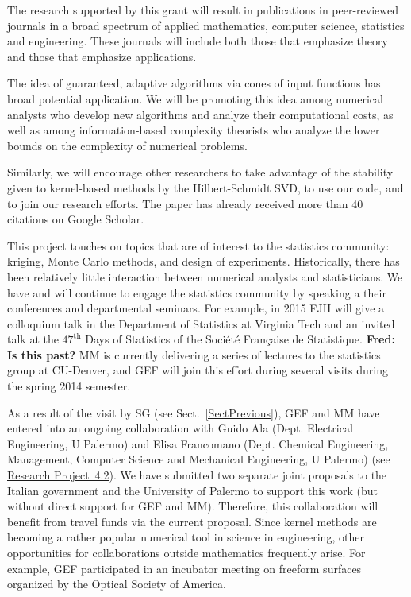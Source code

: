 \documentclass[11pt]{NSFamsart}
\newcommand{\refprobdb}{\hyperref[SectMEEG]{Research Project~4.2}\xspace}
\begin{document}
\begin{description}[leftmargin=0ex]
\item[Disseminating Research]
The research supported by this grant will result in publications in peer-reviewed journals in a broad spectrum of applied mathematics, computer science, statistics and engineering. These journals will include both those that emphasize theory and those that emphasize applications.

\item[Promoting Cones] The idea of guaranteed, adaptive algorithms via cones of input functions has broad potential application.  We will be promoting this idea among numerical analysts who develop new algorithms and analyze their computational costs, as well as among information-based complexity theorists who analyze the lower bounds on the complexity of numerical problems.

\item[Promoting the Hilbert-Schmidt SVD] Similarly, we will encourage other researchers to take advantage of the stability given to kernel-based methods by the Hilbert-Schmidt SVD, to use our code, and to join our research efforts. The paper \citep{FMcC12} has already received more than 40 citations on Google Scholar.

\item[Bridging Mathematics and Statistics]
This project touches on topics that are of interest to the statistics community: kriging, Monte Carlo methods, and design of experiments.  Historically, there has been relatively little interaction between numerical analysts and statisticians.  We have and will continue to engage the statistics community by speaking a their conferences and departmental seminars.  For example, in 2015 FJH will give a colloquium talk in the Department of Statistics at Virginia Tech and an invited talk at the $47^{\text{th}}$ Days of Statistics of the Soci\'et\'e Française de Statistique. \textbf{Fred: Is this past?} MM is currently delivering a series of lectures to the statistics group at CU-Denver, and GEF will join this effort during several visits during the spring 2014 semester.

\item[Collaborating with Engineers]
As a result of the visit by SG (see Sect.~\ref{SectPrevious}), GEF and MM have entered into an ongoing collaboration with Guido Ala (Dept. Electrical Engineering, U Palermo) and Elisa Francomano (Dept. Chemical Engineering, Management, Computer Science and Mechanical Engineering, U Palermo) (see \refprobdb). We have submitted two separate joint proposals to the Italian government and the University of Palermo to support this work (but without direct support for GEF and MM). Therefore, this collaboration will benefit from travel funds via the current proposal.
Since kernel methods are becoming a rather popular numerical tool in science in engineering, other opportunities for collaborations outside mathematics frequently arise. For example, GEF participated in an incubator meeting on freeform surfaces organized by the Optical Society of America.


\end{description}
\end{document}
